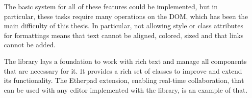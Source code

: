 The basic system for all of these features could be implemented, but in particular, these tasks require many operations on the DOM, which has been the main difficulty of this thesis. In particular, not allowing style or class attributes for formattings means that text cannot be aligned, colored, sized and that links cannot be added.



The library lays a foundation to work with rich text and manage all components that are necessary for it. It provides a rich set of classes to improve and extend its functionality. The Etherpad extension, enabling real-time collaboration, that can be used with any editor implemented with the library, is an example of that.





